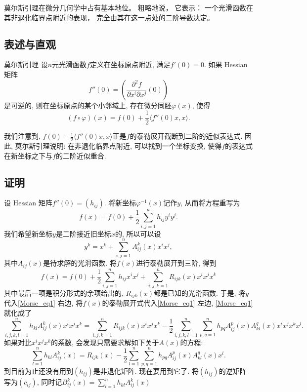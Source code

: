
\begin{issues}
\issueTODO
\issueDraft
\end{issues}


莫尔斯引理在微分几何学中占有基本地位。 粗略地说， 它表示： 一个光滑函数在其非退化临界点附近的表现， 完全由其在这一点处的二阶导数决定。

\subsection{表述与直观}
\begin{lemma}{莫尔斯引理}
设$n$元光滑函数$f$定义在坐标原点附近, 满足$f'(0)=0$. 如果 Hessian 矩阵
$$
f''(0)=\left(\frac{\partial^2f}{\partial x^i\partial x^j}(0)\right)
$$
是可逆的, 则在坐标原点的某个小邻域上, 存在微分同胚$\varphi(x)$, 使得
$$
(f\circ\varphi)(x)=f(0)+\frac{1}{2}\langle f''(0)x,x\rangle.
$$
\end{lemma}

我们注意到, $f(0)+\frac{1}{2}\langle f''(0)x,x\rangle$正是$f$的泰勒展开截断到二阶的近似表达式. 因此, 莫尔斯引理说明: 在非退化临界点附近, 可以找到一个坐标变换, 使得$f$的表达式在新坐标之下与$f$的二阶近似重合.

\subsection{证明}
设 Hessian 矩阵$f''(0)=(h_{ij})$. 将新坐标$\varphi^{-1}(x)$记作$y$, 从而将方程重写为
\begin{equation}\label{Morse_eq1}
f(x)=f(0)+\frac{1}{2}\sum_{i,j=1}^nh_{ij}y^iy^j.
\end{equation}
我们希望新坐标$y$是二阶接近旧坐标$x$的, 所以可以设
$$
y^k
=x^k+\sum_{i,j=1}^nA^k_{ij}(x)x^ix^j,
$$
其中$A_{ij}(x)$是待求解的光滑函数. 将$f(x)$进行泰勒展开到三阶, 得到
$$
f(x)=f(0)+\frac{1}{2}\sum_{i,j=1}^nh_{ij}x^ix^j+
\sum_{i,j,k=1}^nR_{ijk}(x)x^ix^jx^k
$$
其中最后一项是积分形式的余项给出的, $R_{ijk}(x)$都是已知的光滑函数. 于是, 将$y$代入\autoref{Morse_eq1} 右边, 将$f(x)$的泰勒展开式代入\autoref{Morse_eq1} 左边, \autoref{Morse_eq1} 就化成了
$$
\sum_{i,j,k,l=1}^nh_{kl}A^k_{ij}(x)x^ix^jx^k
=\sum_{i,j,k=1}^nR_{ijk}(x)x^ix^jx^k
-\frac{1}{2}\sum_{i,j,k,l=1}^n\sum_{p,q=1}^nh_{pq}A^p_{ij}(x)A^q_{kl}(x)x^ix^jx^kx^l.
$$
如果对比$x^ix^jx^k$的系数, 会发现只需要求解如下关于$A(x)$的方程:
\begin{equation}\label{Morse_eq2}
\sum_{l=1}^nh_{kl}A^k_{ij}(x)
=R_{ijk}(x)
-\frac{1}{2}\sum_{l=1}^n\sum_{p,q=1}^nh_{pq}A^p_{ij}(x)A^q_{kl}(x)x^l.
\end{equation}
到目前为止还没有用到$(h_{ij})$是非退化矩阵. 现在要用到它了. 将$(h_{ij})$的逆矩阵写为$(c_{ij})$, 同时记$B^k_{ij}(x)=\sum_{l=1}^nh_{kl}A^k_{ij}(x)$